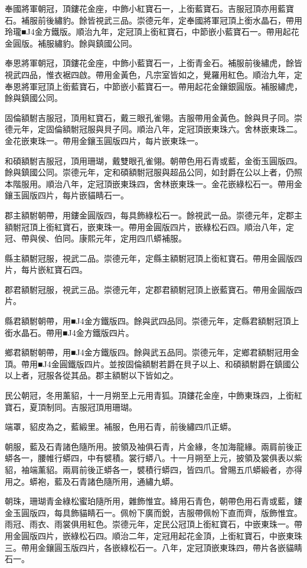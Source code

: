 \begin{pinyinscope}
奉國將軍朝冠，頂鏤花金座，中飾小紅寶石一，上銜藍寶石。吉服冠頂亦用藍寶石。補服前後繡豹。餘皆視武三品。崇德元年，定奉國將軍冠頂上銜水晶石，帶用玲瓏■J4金方鐵版。順治九年，定冠頂上銜紅寶石，中節嵌小藍寶石一。帶用起花金圓版。補服繡豹。餘與鎮國公同。

奉恩將軍朝冠，頂鏤花金座，中飾小藍寶石一，上銜青金石。補服前後繡虎，餘皆視武四品，惟衣裾四啟。帶用金黃色，凡宗室皆如之，覺羅用紅色。順治九年，定奉恩將軍冠頂上銜藍寶石，中節嵌小藍寶石一。帶用起花金鑲銀圓版。補服繡虎，餘與鎮國公同。

固倫額駙吉服冠，頂用紅寶石，戴三眼孔雀翎。吉服帶用金黃色。餘與貝子同。崇德元年，定固倫額駙冠服與貝子同。順治八年，定冠頂嵌東珠六。舍林嵌東珠二。金花嵌東珠一。帶用金鑲玉圓版四片，每片嵌東珠一。

和碩額駙吉服冠，頂用珊瑚，戴雙眼孔雀翎。朝帶色用石青或藍，金銜玉圓版四。餘與鎮國公同。崇德元年，定和碩額駙冠服與超品公同，如封爵在公以上者，仍照本階服用。順治八年，定冠頂嵌東珠四，舍林嵌東珠一。金花嵌綠松石一。帶用金鑲玉圓版四片，每片嵌貓睛石一。

郡主額駙朝帶，用鏤金圓版四，每具飾綠松石一。餘視武一品。崇德元年，定郡主額駙冠頂上銜紅寶石，嵌東珠一。帶用金圓版四片，嵌綠松石四。順治八年，定冠、帶與侯、伯同。康熙元年，定用四爪蟒補服。

縣主額駙冠服，視武二品。崇德元年，定縣主額駙冠頂上銜紅寶石。帶用金圓版四片，每片嵌紅寶石四。

郡君額駙冠服，視武三品。崇德元年，定郡君額駙冠頂上嵌藍寶石。帶用金圓版四片。

縣君額駙朝帶，用■J4金方鐵版四。餘與武四品同。崇德元年，定縣君額駙冠頂上銜水晶石。帶用■J4金方鐵版四片。

鄉君額駙朝帶，用■J4金方鐵版四。餘與武五品同。崇德元年，定鄉君額駙冠用金頂。帶用■J4金圓鐵版四片。並按固倫額駙若爵在貝子以上、和碩額駙爵在鎮國公以上者，冠服各從其品。郡主額駙以下皆如之。

民公朝冠，冬用薰貂，十一月朔至上元用青狐。頂鏤花金座，中飾東珠四，上銜紅寶石，夏頂制同。吉服冠頂用珊瑚。

端罩，貂皮為之，藍緞里。補服，色用石青，前後繡四爪正蟒。

朝服，藍及石青諸色隨所用。披領及袖俱石青，片金緣，冬加海龍緣。兩肩前後正蟒各一，腰帷行蟒四，中有襞積。裳行蟒八。十一月朔至上元，披領及裳俱表以紫貂，袖端薰貂。兩肩前後正蟒各一，襞積行蟒四，皆四爪。曾賜五爪蟒緞者，亦得用之。蟒袍，藍及石青諸色隨所用，通繡九蟒。

朝珠，珊瑚青金綠松蜜珀隨所用，雜飾惟宜。絳用石青色，朝帶色用石青或藍，鏤金玉圓版四，每具飾貓睛石一。佩帉下廣而銳，吉服帶佩帉下直而齊，版飾惟宜。雨冠、雨衣、雨裳俱用紅色。崇德元年，定民公冠頂上銜紅寶石，中嵌東珠一。帶用金圓版四片，嵌綠松石四。順治二年，定冠用起花金頂，上銜紅寶石，中嵌東珠三。帶用金鑲圓玉版四片，各嵌綠松石一。八年，定冠頂嵌東珠四，帶片各嵌貓睛石一。


\end{pinyinscope}
